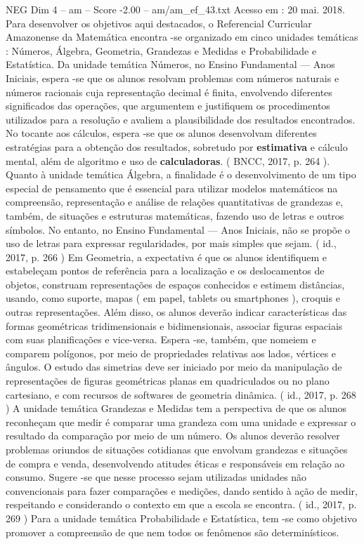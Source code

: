 \begin{textsample}{NEG Dim 4 – am – Score -2.00 – am/am\_ef\_43.txt}
Acesso em : 20 mai. 2018.
Para desenvolver os objetivos aqui destacados, o Referencial Curricular Amazonense da Matemática encontra -se organizado em cinco unidades temáticas : Números, Álgebra, Geometria, Grandezas e Medidas e Probabilidade e Estatística.
Da unidade temática Números, no Ensino Fundamental — Anos Iniciais, espera -se que os alunos resolvam problemas com números naturais e números racionais cuja representação decimal é finita, envolvendo diferentes significados das operações, que argumentem e justifiquem os procedimentos utilizados para a resolução e avaliem a plausibilidade dos resultados encontrados.
No tocante aos cálculos, espera -se que os alunos desenvolvam diferentes estratégias para a obtenção dos resultados, sobretudo por \textbf{estimativa} e cálculo mental, além de algoritmo e uso de \textbf{calculadoras}. ( BNCC, 2017, p. 264 ).
Quanto à unidade temática Álgebra, a finalidade é o desenvolvimento de um tipo especial de pensamento que é essencial para utilizar modelos matemáticos na compreensão, representação e análise de relações quantitativas de grandezas e, também, de situações e estruturas matemáticas, fazendo uso de letras e outros símbolos.
No entanto, no Ensino Fundamental — Anos Iniciais, não se propõe o uso de letras para expressar regularidades, por mais simples que sejam. ( id., 2017, p. 266 ) Em Geometria, a expectativa é que os alunos identifiquem e estabeleçam pontos de referência para a localização e os deslocamentos de objetos, construam representações de espaços conhecidos e estimem distâncias, usando, como suporte, mapas ( em papel, tablets ou smartphones ), croquis e outras representações.
Além disso, os alunos deverão indicar características das formas geométricas tridimensionais e bidimensionais, associar figuras espaciais com suas planificações e vice-versa.
Espera -se, também, que nomeiem e comparem polígonos, por meio de propriedades relativas aos lados, vértices e ângulos.
O estudo das simetrias deve ser iniciado por meio da manipulação de representações de figuras geométricas planas em quadriculados ou no plano cartesiano, e com recursos de softwares de geometria dinâmica. ( id., 2017, p. 268 ) A unidade temática Grandezas e Medidas tem a perspectiva de que os alunos reconheçam que medir é comparar uma grandeza com uma unidade e expressar o resultado da comparação por meio de um número.
Os alunos deverão resolver problemas oriundos de situações cotidianas que envolvam grandezas e situações de compra e venda, desenvolvendo atitudes éticas e responsáveis em relação ao consumo.
Sugere -se que nesse processo sejam utilizadas unidades não convencionais para fazer comparações e medições, dando sentido à ação de medir, respeitando e considerando o contexto em que a escola se encontra. ( id., 2017, p. 269 ) Para a unidade temática Probabilidade e Estatística, tem -se como objetivo promover a compreensão de que nem todos os fenômenos são determinísticos.

\end{textsample}
